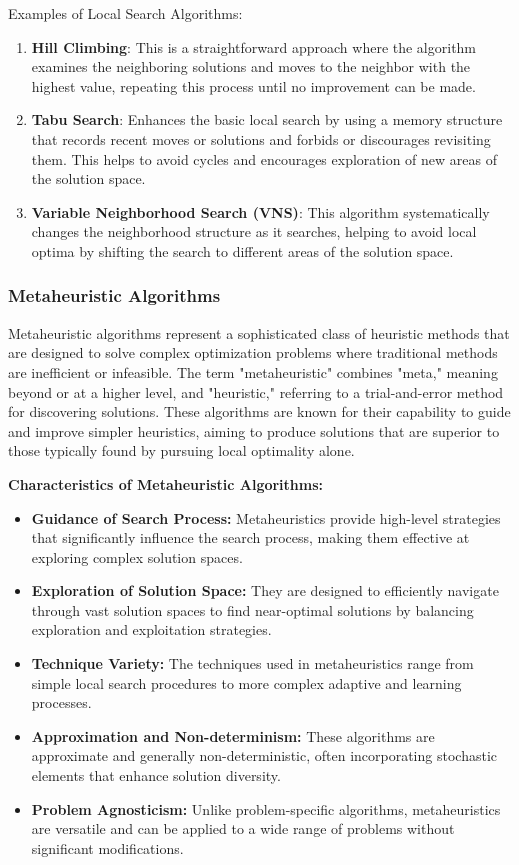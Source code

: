 \documentclass[
]{article}
\begin{document}
Examples of Local Search Algorithms:
\begin{enumerate}
  \item \textbf{Hill Climbing}: This is a straightforward approach where the algorithm examines the neighboring solutions and moves to the neighbor with the highest value, repeating this process until no improvement can be made.
  \item \textbf{Tabu Search}: Enhances the basic local search by using a memory structure that records recent moves or solutions and forbids or discourages revisiting them. This helps to avoid cycles and encourages exploration of new areas of the solution space.
  \item \textbf{Variable Neighborhood Search (VNS)}: This algorithm systematically changes the neighborhood structure as it searches, helping to avoid local optima by shifting the search to different areas of the solution space.
\end{enumerate}


\hypertarget{metaheuristic-algorithms}{%
  \subsubsection{Metaheuristic Algorithms}\label{metaheuristic-algorithms}}

Metaheuristic algorithms represent a sophisticated class of heuristic methods that are designed to solve complex optimization problems where traditional methods are inefficient or infeasible. The term "metaheuristic" combines "meta," meaning beyond or at a higher level, and "heuristic," referring to a trial-and-error method for discovering solutions. These algorithms are known for their capability to guide and improve simpler heuristics, aiming to produce solutions that are superior to those typically found by pursuing local optimality alone.

\textbf{Characteristics of Metaheuristic Algorithms:}
\begin{itemize}
  \item \textbf{Guidance of Search Process:} Metaheuristics provide high-level strategies that significantly influence the search process, making them effective at exploring complex solution spaces.
  \item \textbf{Exploration of Solution Space:} They are designed to efficiently navigate through vast solution spaces to find near-optimal solutions by balancing exploration and exploitation strategies.
  \item \textbf{Technique Variety:} The techniques used in metaheuristics range from simple local search procedures to more complex adaptive and learning processes.
  \item \textbf{Approximation and Non-determinism:} These algorithms are approximate and generally non-deterministic, often incorporating stochastic elements that enhance solution diversity.
  \item \textbf{Problem Agnosticism:} Unlike problem-specific algorithms, metaheuristics are versatile and can be applied to a wide range of problems without significant modifications.
\end{itemize}
\end{document}
